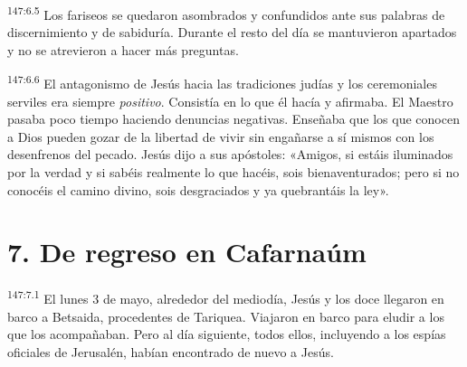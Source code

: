 \par
\textsuperscript{147:6.5} Los fariseos se quedaron asombrados y confundidos ante sus palabras de discernimiento y de sabiduría. Durante el resto del día se mantuvieron apartados y no se atrevieron a hacer más preguntas.

\par
\textsuperscript{147:6.6} El antagonismo de Jesús hacia las tradiciones judías y los ceremoniales serviles era siempre \textit{positivo}. Consistía en lo que él hacía y afirmaba. El Maestro pasaba poco tiempo haciendo denuncias negativas. Enseñaba que los que conocen a Dios pueden gozar de la libertad de vivir sin engañarse a sí mismos con los desenfrenos del pecado. Jesús dijo a sus apóstoles: «Amigos, si estáis iluminados por la verdad y si sabéis realmente lo que hacéis, sois bienaventurados; pero si no conocéis el camino divino, sois desgraciados y ya quebrantáis la ley».

\section*{7. De regreso en Cafarnaúm}
\par
\textsuperscript{147:7.1} El lunes 3 de mayo, alrededor del mediodía, Jesús y los doce llegaron en barco a Betsaida, procedentes de Tariquea. Viajaron en barco para eludir a los que los acompañaban. Pero al día siguiente, todos ellos, incluyendo a los espías oficiales de Jerusalén, habían encontrado de nuevo a Jesús.

